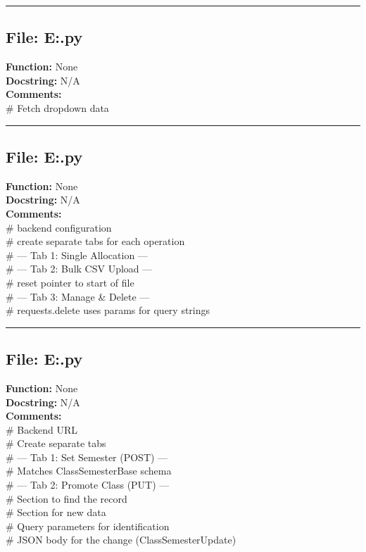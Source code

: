{\hrule

\subsection*{File: E:\project\capstone\frontend\hod\Ci.py}
\textbf{Function:} None\\
\textbf{Docstring:} N/A\\
\textbf{Comments:}\\
# Fetch dropdown data\\

\hrule

\subsection*{File: E:\project\capstone\frontend\hod\CS.py}
\textbf{Function:} None\\
\textbf{Docstring:} N/A\\
\textbf{Comments:}\\
# backend configuration\\
# create separate tabs for each operation\\
# --- Tab 1: Single Allocation ---\\
# --- Tab 2: Bulk CSV Upload ---\\
# reset pointer to start of file\\
# --- Tab 3: Manage & Delete ---\\
# requests.delete uses params for query strings\\

\hrule

\subsection*{File: E:\project\capstone\frontend\hod\CSem.py}
\textbf{Function:} None\\
\textbf{Docstring:} N/A\\
\textbf{Comments:}\\
# Backend URL\\
# Create separate tabs\\
# --- Tab 1: Set Semester (POST) ---\\
# Matches ClassSemesterBase schema\\
# --- Tab 2: Promote Class (PUT) ---\\
# Section to find the record\\
# Section for new data\\
# Query parameters for identification\\
# JSON body for the change (ClassSemesterUpdate)\\

}
